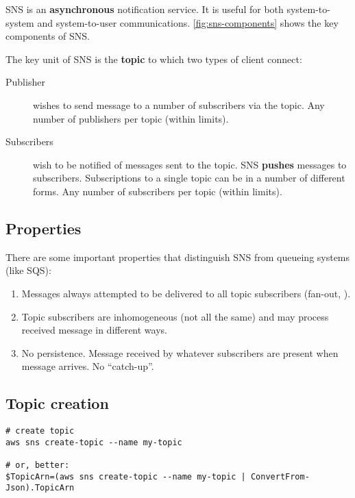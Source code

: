 SNS is an \textbf{asynchronous} notification service. It is useful for
both system-to-system and system-to-user communications. \autoref{fig:sns-components} shows the key
components of SNS.


The key unit of SNS is the \textbf{topic} to which two types of client
connect:

\begin{description}
\item[Publisher]
wishes to send message to a number of subscribers via the topic. Any
number of publishers per topic (within limits).
\item[Subscribers]
wish to be notified of messages sent to the topic. SNS \textbf{pushes}
messages to subscribers. Subscriptions to a single topic can be in a
number of different forms. Any number of subscribers per topic (within
limits).
\end{description}

\subsection{Properties}\label{properties}

There are some important properties that distinguish SNS from queueing
systems (like SQS):

\begin{enumerate}
\item
  Messages always attempted to be delivered to all topic subscribers
  (fan-out, ).
\item
  Topic subscribers are inhomogeneous (not all the same) and may process
  received message in different ways.
\item
  No persistence. Message received by whatever subscribers are present
  when message arrives. No ``catch-up''.
\end{enumerate}

\subsection{Topic creation}\label{topic-creation}

\begin{verbatim}
# create topic
aws sns create-topic --name my-topic

# or, better:
$TopicArn=(aws sns create-topic --name my-topic | ConvertFrom-Json).TopicArn
\end{verbatim}


